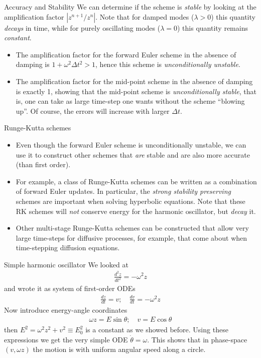 \documentclass[aspectratio=43]{beamer}
\begin{document}
\begin{frame}{Accuracy and Stability}
  We can determine if the scheme is \emph{stable} by looking at the
  amplification factor $| z^{n+1}/z^n|$. Note that for damped modes
  ($\lambda>0$) this quantity \emph{decays} in time, while for purely
  oscillating modes ($\lambda = 0$) this quantity remains
  \emph{constant}.

  
  \begin{itemize}
  \item The amplification factor for the forward Euler scheme in the
    absence of damping is $1+\omega^2\Delta t^2 > 1$, hence this
    scheme is \emph{unconditionally unstable}.
  \item The amplification factor for the mid-point scheme in the
    absence of damping is exactly 1, showing that the mid-point scheme
    is \emph{unconditionally stable}, that is, one can take as large
    time-step one wants without the scheme ``blowing up''. Of course,
    the errors will increase with larger $\Delta t$.
  \end{itemize}
\end{frame}

\begin{frame}{Runge-Kutta schemes}
  \begin{itemize}
  \item Even though the forward Euler scheme is unconditionally
    unstable, we can use it to construct other schemes that \emph{are}
    stable and are also more accurate (than first order).
  \item For example, a class of Runge-Kutta schemes can be written as
    a combination of forward Euler updates. In particular, the
    \emph{strong stability preserving} schemes are important when
    solving hyperbolic equations. Note that these RK schemes will
    \emph{not} conserve energy for the harmonic oscillator, but
    \emph{decay} it.
  \item Other multi-stage Runge-Kutta schemes can be constructed that
    allow very large time-steps for diffusive processes, for example,
    that come about when time-stepping diffusion equations.
  \end{itemize}
\end{frame}

\begin{frame}{Simple harmonic oscillator}
  We looked at
  \begin{align*}
    \frac{d^2z}{dt^2} = -\omega^2 z
  \end{align*}
  and wrote it as system of first-order ODEs
  \begin{align*}
    \frac{dz}{dt} = v; \quad \frac{dv}{dt} = -\omega^2 z
  \end{align*}
  Now introduce energy-angle coordinates
  \begin{align*}
    \omega z = E\sin\theta; \quad v = E\cos\theta
  \end{align*}
  then $E^2 = \omega^2 z^2 + v^2 \equiv E_0^2$ is a constant as we
  showed before. Using these expressions we get the very simple ODE
  $\dot{\theta} = \omega$. This shows that in phase-space
  $(v,\omega z)$ the motion is with uniform angular speed along a
  circle.
\end{frame}
\end{document}
